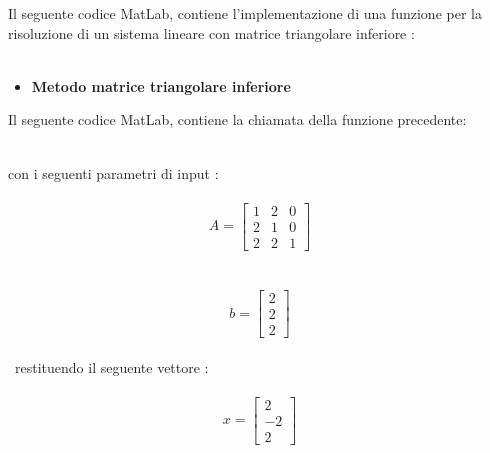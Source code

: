 Il seguente codice MatLab, contiene l'implementazione di una funzione per la risoluzione di un sistema lineare con matrice triangolare inferiore :\\\
\begin{itemize}
\item \textbf{Metodo matrice triangolare inferiore}

\end{itemize}
Il seguente codice MatLab, contiene la chiamata della funzione precedente:\\\

con i seguenti parametri di input :\\\
\[
A =\begin{bmatrix}
	1 & 2 & 0 \\ 
	2 & 1 & 0 \\
	2 & 2 & 1 
\end{bmatrix}
\]\\\	
\[
b =\begin{bmatrix}
  2 \\
  2 \\
  2
\end{bmatrix}
\]\\\
restituendo il seguente vettore :\\\
\[
x =\begin{bmatrix}
  2 \\
  -2 \\
  2
\end{bmatrix}
\]
